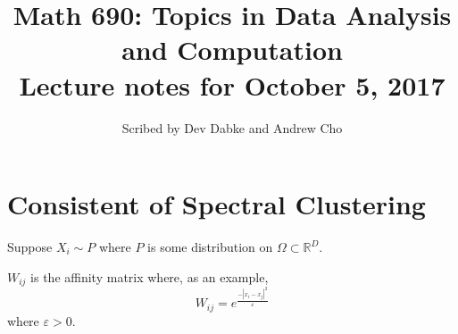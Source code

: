 \documentclass[12pt]{article}
\title{Math 690: Topics in Data Analysis and Computation \\
Lecture notes for October 5, 2017}
\date{}
\author{Scribed by Dev Dabke and Andrew Cho}
\theoremstyle{plain}
\begin{document}
\maketitle

\section{Consistent of Spectral Clustering}

Suppose $ X_{i} \sim P $ where $ P $ is some distribution on $ \Omega \subset \mathbb{R}^{D} $.

$ W_{ij} $ is the affinity matrix where, as an example,
\[
W_{ij} = e^{\frac{-|x_i - x_j|^2}{\varepsilon}}
\]
where $ \varepsilon > 0 $.
\end{document}
